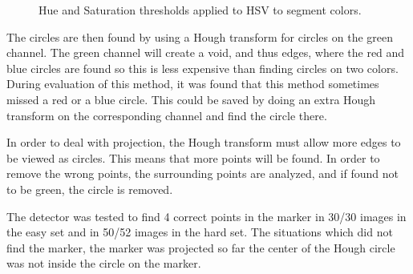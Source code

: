 \begin{figure}[h]
\caption{Hue and Saturation thresholds applied to HSV to segment colors.}
\label{fig:hsv_color_segmentation}
\end{figure}

The circles are then found by using a Hough transform for circles on the green channel.
The green channel will create a void, and thus edges, where the red and blue circles are found so this is less expensive than finding circles on two colors.
During evaluation of this method, it was found that this method sometimes missed a red or a blue circle.
This could be saved by doing an extra Hough transform on the corresponding channel and find the circle there.

In order to deal with projection, the Hough transform must allow more edges to be viewed as circles.
This means that more points will be found.
In order to remove the wrong points, the surrounding points are analyzed, and if found not to be green, the circle is removed.

The detector was tested to find 4 correct points in the marker in 30/30 images in the easy set and in 50/52 images in the hard set.
The situations which did not find the marker, the marker was projected so far the center of the Hough circle was not inside the circle on the marker.

% 


